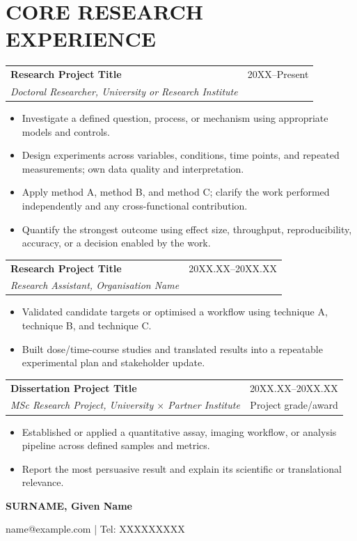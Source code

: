 \documentclass[a4paper,11pt]{article}
\makeatletter
\newcommand{\cvheading}[4]{%
  \par\addvspace{5pt}\noindent\begin{tabularx}{\linewidth}{@{}>{\raggedright\arraybackslash}Xr@{}}
    \textbf{#1} & \color{muted}\small #2 \\
    \textit{#3} & \color{muted}\small #4
  \end{tabularx}\par\vspace{-1pt}}
\newcommand{\cvheadingfirst}[4]{%
  \par\noindent\begin{tabularx}{\linewidth}{@{}>{\raggedright\arraybackslash}Xr@{}}
    \textbf{#1} & \color{muted}\small #2 \\
    \textit{#3} & \color{muted}\small #4
  \end{tabularx}\par\vspace{-1pt}}
\newenvironment{cvitems}{%
  \begin{itemize}[leftmargin=4.6mm,label=\raisebox{0.25ex}{\tiny$\bullet$},itemsep=2pt,topsep=2.2pt,parsep=0pt,partopsep=0pt]\justifying
}{\end{itemize}\vspace{1.5pt}}
\makeatother
\begin{document}
\section{CORE RESEARCH EXPERIENCE}
\cvheadingfirst{Research Project Title}{20XX--Present}{Doctoral Researcher, University or Research Institute}{ }
\begin{cvitems}
  \item Investigate a defined question, process, or mechanism using appropriate models and controls.
  \item Design experiments across variables, conditions, time points, and repeated measurements; own data quality and interpretation.
  \item Apply method A, method B, and method C; clarify the work performed independently and any cross-functional contribution.
  \item Quantify the strongest outcome using effect size, throughput, reproducibility, accuracy, or a decision enabled by the work.
\end{cvitems}
\cvheading{Research Project Title}{20XX.XX--20XX.XX}{Research Assistant, Organisation Name}{ }
\begin{cvitems}
  \item Validated candidate targets or optimised a workflow using technique A, technique B, and technique C.
  \item Built dose/time-course studies and translated results into a repeatable experimental plan and stakeholder update.
\end{cvitems}
\cvheading{Dissertation Project Title}{20XX.XX--20XX.XX}{MSc Research Project, University $\times$ Partner Institute}{Project grade/award}
\begin{cvitems}
  \item Established or applied a quantitative assay, imaging workflow, or analysis pipeline across defined samples and metrics.
  \item Report the most persuasive result and explain its scientific or translational relevance.
\end{cvitems}

\newpage
\begin{flushright}
  {\Large\bfseries SURNAME, Given Name}\par
  \vspace{2pt}
  {\color{muted}\small name@example.com \enspace | \enspace Tel: XXXXXXXXX}
\end{flushright}
\vspace{-10pt}
\end{document}
